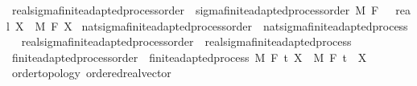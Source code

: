 \begin{isabellebody}
\isamarkupfalse%
\ real{\isacharunderscore}{\kern0pt}sigma{\isacharunderscore}{\kern0pt}finite{\isacharunderscore}{\kern0pt}adapted{\isacharunderscore}{\kern0pt}process{\isacharunderscore}{\kern0pt}order\ {\isacharequal}{\kern0pt}\ sigma{\isacharunderscore}{\kern0pt}finite{\isacharunderscore}{\kern0pt}adapted{\isacharunderscore}{\kern0pt}process{\isacharunderscore}{\kern0pt}order\ M\ F\ {\isachardoublequoteopen}{}\ {\isacharcolon}{\kern0pt}{\isacharcolon}{\kern0pt}\ real{\isachardoublequoteclose}\ X\ \ M\ F\ X\isanewline
\isanewline
{}\isamarkupfalse%
\ nat{\isacharunderscore}{\kern0pt}sigma{\isacharunderscore}{\kern0pt}finite{\isacharunderscore}{\kern0pt}adapted{\isacharunderscore}{\kern0pt}process{\isacharunderscore}{\kern0pt}order\ {\isasymsubseteq}\ nat{\isacharunderscore}{\kern0pt}sigma{\isacharunderscore}{\kern0pt}finite{\isacharunderscore}{\kern0pt}adapted{\isacharunderscore}{\kern0pt}process%
\isadelimproof
\ %
\endisadelimproof
%
\isatagproof
\isacommand{{\isachardot}{\kern0pt}{\isachardot}{\kern0pt}}\isamarkupfalse%
%
\endisatagproof
{\isafoldproof}%
%
\isadelimproof
%
\endisadelimproof
\isanewline
{}\isamarkupfalse%
\ real{\isacharunderscore}{\kern0pt}sigma{\isacharunderscore}{\kern0pt}finite{\isacharunderscore}{\kern0pt}adapted{\isacharunderscore}{\kern0pt}process{\isacharunderscore}{\kern0pt}order\ {\isasymsubseteq}\ real{\isacharunderscore}{\kern0pt}sigma{\isacharunderscore}{\kern0pt}finite{\isacharunderscore}{\kern0pt}adapted{\isacharunderscore}{\kern0pt}process%
\isadelimproof
\ %
\endisadelimproof
%
\isatagproof
\isacommand{{\isachardot}{\kern0pt}{\isachardot}{\kern0pt}}\isamarkupfalse%
%
\endisatagproof
{\isafoldproof}%
%
\isadelimproof
%
\endisadelimproof
\isanewline
\isanewline
{}\isamarkupfalse%
\ finite{\isacharunderscore}{\kern0pt}adapted{\isacharunderscore}{\kern0pt}process{\isacharunderscore}{\kern0pt}order\ {\isacharequal}{\kern0pt}\ finite{\isacharunderscore}{\kern0pt}adapted{\isacharunderscore}{\kern0pt}process\ M\ F\ t\ X\ \ M\ F\ t\ \ X\ {\isacharcolon}{\kern0pt}{\isacharcolon}{\kern0pt}\ {\isachardoublequoteopen}{\isacharunderscore}{\kern0pt}\ \ {\isasymRightarrow}\ {\isacharunderscore}{\kern0pt}\ {\isasymRightarrow}\ {\isacharunderscore}{\kern0pt}\ {\isacharcolon}{\kern0pt}{\isacharcolon}{\kern0pt}\ {\isacharbraceleft}{\kern0pt}order{\isacharunderscore}{\kern0pt}topology{\isacharcomma}{\kern0pt}\ ordered{\isacharunderscore}{\kern0pt}real{\isacharunderscore}{\kern0pt}vector{\isacharbraceright}{\kern0pt}{\isachardoublequoteclose}\ \isanewline

\end{isabellebody}
